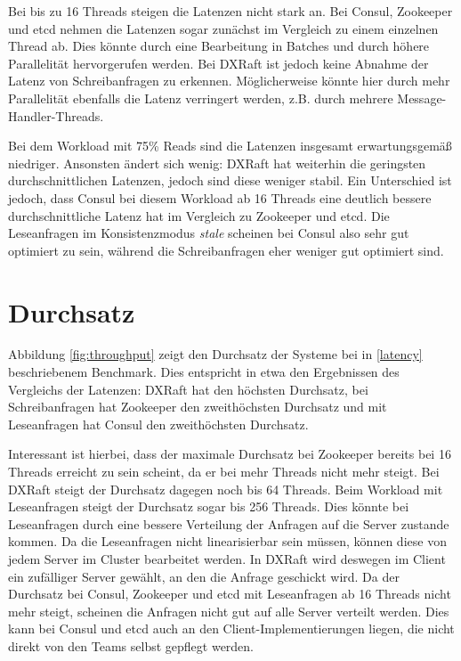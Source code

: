 Bei bis zu 16 Threads steigen die Latenzen nicht stark an. Bei Consul, Zookeeper und etcd nehmen die Latenzen sogar zunächst im Vergleich zu einem einzelnen Thread ab. Dies könnte durch eine Bearbeitung in Batches und durch höhere Parallelität hervorgerufen werden. Bei DXRaft ist jedoch keine Abnahme der Latenz von Schreibanfragen zu erkennen. Möglicherweise könnte hier durch mehr Parallelität ebenfalls die Latenz verringert werden, z.B. durch mehrere Message-Handler-Threads.

Bei dem Workload mit 75\% Reads sind die Latenzen insgesamt erwartungsgemäß niedriger. Ansonsten ändert sich wenig: DXRaft hat weiterhin die geringsten durchschnittlichen Latenzen, jedoch sind diese weniger stabil. Ein Unterschied ist jedoch, dass Consul bei diesem Workload ab 16 Threads eine deutlich bessere durchschnittliche Latenz hat im Vergleich zu Zookeeper und etcd. Die Leseanfragen im Konsistenzmodus \textit{stale} scheinen bei Consul also sehr gut optimiert zu sein, während die Schreibanfragen eher weniger gut optimiert sind.

\section{Durchsatz}

Abbildung \ref{fig:throughput} zeigt den Durchsatz der Systeme bei in \ref{latency} beschriebenem Benchmark. Dies entspricht in etwa den Ergebnissen des Vergleichs der Latenzen: DXRaft hat den höchsten Durchsatz, bei Schreibanfragen hat Zookeeper den zweithöchsten Durchsatz und mit Leseanfragen hat Consul den zweithöchsten Durchsatz.

Interessant ist hierbei, dass der maximale Durchsatz bei Zookeeper bereits bei 16 Threads erreicht zu sein scheint, da er bei mehr Threads nicht mehr steigt. Bei DXRaft steigt der Durchsatz dagegen noch bis 64 Threads. Beim Workload mit Leseanfragen steigt der Durchsatz sogar bis 256 Threads. Dies könnte bei Leseanfragen durch eine bessere Verteilung der Anfragen auf die Server zustande kommen. Da die Leseanfragen nicht linearisierbar sein müssen, können diese von jedem Server im Cluster bearbeitet werden. In DXRaft wird deswegen im Client ein zufälliger Server gewählt, an den die Anfrage geschickt wird. Da der Durchsatz bei Consul, Zookeeper und etcd mit Leseanfragen ab 16 Threads nicht mehr steigt, scheinen die Anfragen nicht gut auf alle Server verteilt werden. Dies kann bei Consul und etcd auch an den Client-Implementierungen liegen, die nicht direkt von den Teams selbst gepflegt werden.


